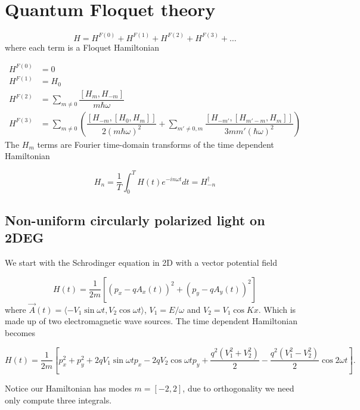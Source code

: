 \section{Quantum Floquet theory}

\begin{equation}
  H = H^{F(0)} + H^{F(1)} + H^{F(2)} + H^{F(3)} + \dots
\end{equation}
where each term is a Floquet Hamiltonian

\begin{align}
  H^{F(0)} &= 0 \\
  H^{F(1)} &= H_0 \\
  H^{F(2)} &= \sum_{m\neq 0} \dfrac{[H_m, H_{-m}]}{m\hbar\omega} \\
  H^{F(3)} &= \sum_{m\neq 0} \left( \dfrac{[H_{-m} , [H_0, H_m]]}{2(m\hbar\omega)^2} + \sum_{m'\neq 0, m} \dfrac{[H_{-m'}, [H_{m'-m}, H_m]]}{3mm'(\hbar\omega)^2} \right)
\end{align}
The $H_m$ terms are Fourier time-domain transforms of the time dependent Hamiltonian

\begin{equation}
  H_n = \dfrac{1}{T} \int_0^T H(t) e^{-in\omega t} dt = H_{-n}^{\dagger}
\end{equation}

\subsection{Non-uniform circularly polarized light on 2DEG}

We start with the Schrodinger equation in 2D with a vector potential field

\begin{equation}
  H(t) = \dfrac{1}{2m} \left[ (p_x - qA_x(t))^2 + (p_y - qA_y(t))^2 \right]
\end{equation}
where $\vec{A}(t) = \langle -V_1\sin{\omega t} , V_2\cos{\omega t} \rangle$, $V_1 = E/\omega$ and $V_2 = V_1 \cos{Kx}$.
Which is made up of two electromagnetic wave sources.
The time dependent Hamiltonian becomes

\begin{equation}
  H(t) = \dfrac{1}{2m} \left[ p_x^2 + p_y^2 + 2qV_1\sin{\omega t} p_x - 2qV_2\cos{\omega t} p_y + \dfrac{q^2(V_1^2+V_2^2)}{2} -\dfrac{q^2(V_1^2-V_2^2)}{2}\cos{2\omega t} \right].
\end{equation}

Notice our Hamiltonian has modes $m = [-2,2]$, due to orthogonality we need only compute three integrals.

